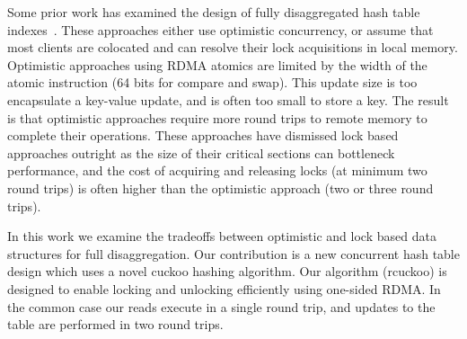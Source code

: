 Some prior work has examined the design of fully
disaggregated hash table indexes~\cite{sherman, race, fusee,
rolex}.  These approaches either use optimistic concurrency,
or assume that most clients are colocated and can resolve
their lock acquisitions in local memory. Optimistic
approaches using RDMA atomics are limited by the width of
the atomic instruction (64 bits for compare and swap). This
update size is too encapsulate a key-value update, and is
often too small to store a key. The result is that
optimistic approaches require more round trips to remote
memory to complete their operations. These approaches have
dismissed lock based approaches outright as the size of
their critical sections can bottleneck performance, and  the
cost of acquiring and releasing locks (at minimum two round
trips) is often higher than the optimistic approach (two or
three round trips).



In this work we examine the tradeoffs between optimistic and
lock based data structures for full disaggregation. Our
contribution is a new concurrent hash table design which
uses a novel cuckoo hashing algorithm. Our algorithm
(rcuckoo) is designed to enable locking and unlocking
efficiently using one-sided RDMA. In the common case our
reads execute in a single round trip, and updates to the
table are performed in two round trips. 

